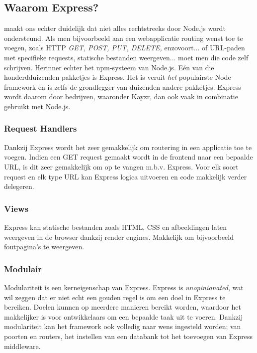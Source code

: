 \subsection{Waarom Express?}
\label{sec:whyExpress}

\textcite{ExpressMozilla} maakt ons echter duidelijk dat niet alles rechtstreeks door Node.js wordt ondersteund. Als men bijvoorbeeld aan een webapplicatie routing wenst toe te voegen, zoals HTTP \textsl{GET, POST, PUT, DELETE,} enzovoort... of URL-paden met specifieke requests, statische bestanden weergeven... moet men die code zelf schrijven. Herinner echter het npm-systeem van Node.js. Eén van die honderdduizenden pakketjes is Express. Het is veruit \textit{het} populairste Node framework en is zelfs de grondlegger van duizenden andere pakketjes. Express wordt daarom door bedrijven, waaronder Kayzr, dan ook vaak in combinatie gebruikt met Node.js.

\subsubsection{Request Handlers}
\label{sec:reqHandlers}

Dankzij Express wordt het zeer gemakkelijk om routering in een applicatie toe te voegen. Indien een GET request gemaakt wordt in de frontend naar een bepaalde URL, is dit zeer gemakkelijk om op te vangen m.b.v. Express. Voor elk soort request en elk type URL kan Express logica uitvoeren en code makkelijk verder delegeren.

\subsubsection{Views}
\label{sec:expressViews}

Express kan statische bestanden zoals HTML, CSS en afbeeldingen laten weergeven in de browser dankzij render engines. Makkelijk om bijvoorbeeld foutpagina's te weergeven.

\subsubsection{Modulair}
\label{sec:expressModularity}

Modulariteit is een kerneigenschap van Express. Express is \textit{unopinionated}, wat wil zeggen dat er niet echt een gouden regel is om een doel in Express te bereiken. Doelen kunnen op meerdere manieren bereikt worden, waardoor het makkelijker is voor ontwikkelaars om een bepaalde taak uit te voeren. Dankzij modulariteit kan het framework ook volledig naar wens ingesteld worden; van poorten en routers, het instellen van een databank tot het toevoegen van Express middleware. 


